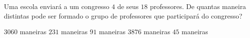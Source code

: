 Uma escola enviará a um congresso $4$ de seus $18$ professores. De quantas maneira distintas pode ser formado o grupo de professores que participará do congresso?

$3060$ maneiras
$231$ maneiras
$91$ maneiras
$3876$ maneiras
$45$ maneiras


